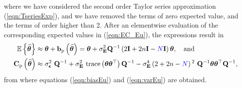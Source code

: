 where we have considered the second order Taylor series approximation (\ref{eqn:TseriesExp}), and we have removed the terms of zero expected value, and the terms of order higher than 2.
After an elementwise evaluation of the corresponding expected values in (\ref{eqn:EC_Eu}), the expressions result in 
\begin{equation} \begin{aligned} \mathbb{E} \left\{ \widehat{\bm{\theta}} \right\} & \approx \bm{\theta}  + \mathbf{b}_{\mathrm{p}} \left( \widehat{\bm{\theta}} \right) = \bm{\theta}  +  \sigma_{\mathbf{E}}^2 \mathbf{Q}^{-1} \left( 2\mathbf{I} + 2n\mathbf{I} - \color{blue}N\color{black} \mathbf{I} \right) \bm{\theta} , \quad \text{and} \\ 
\mathbf{C}_{\mathrm{p}} \left( \widehat{\bm{\theta}} \right) & \approx \sigma_{\bm{\epsilon}}^2 \ \mathbf{Q}^{-1} + \sigma_{\mathbf{E}}^2 \ \mathrm{trace} \left( \bm{\theta} \bm{\theta}^\top \right) \mathbf{Q}^{-1} - \sigma_{\mathbf{E}}^4 \left( 2 + 2n - \color{blue}N\color{black} \right)^2 \ \mathbf{Q}^{-1} \bm{\theta} \bm{\theta}^\top \mathbf{Q}^{-1} , \end{aligned} \end{equation}
from where equations (\ref{eqn:biasEu}) and (\ref{eqn:varEu}) are obtained.

